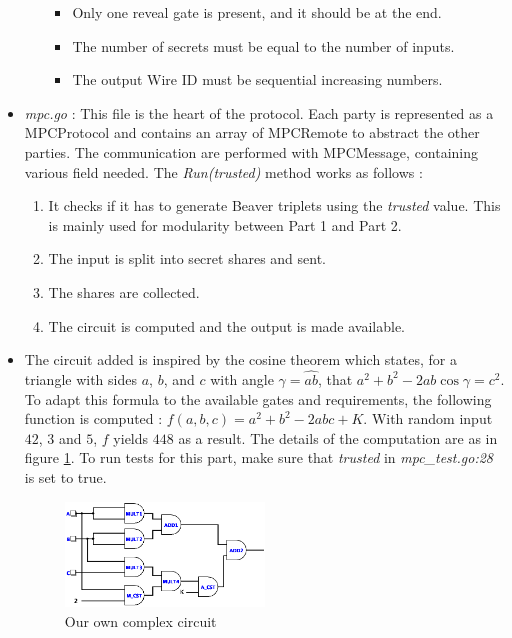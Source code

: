 \documentclass[10pt,conference]{IEEEtran}
\begin{document}
\begin{itemize}
\begin{itemize}
            \begin{itemize}
                \item Only one reveal gate is present, and it should be at the end.
                \item The number of secrets must be equal to the number of inputs.
                \item The output Wire ID must be sequential increasing numbers.
            \end{itemize}
        \end{itemize}
    \item \textit{mpc.go} : This file is the heart of the protocol. Each party is represented as a MPCProtocol and contains an array of MPCRemote to abstract the other parties. The communication are performed with MPCMessage, containing various field needed. The \textit{Run(trusted)} method works as follows :
        \begin{enumerate}
            \item It checks if it has to generate Beaver triplets using the \textit{trusted} value. This is mainly used for modularity between Part 1 and Part 2.
            \item The input is split into secret shares and sent.
            \item The shares are collected.
            \item The circuit is computed and the output is made available.
        \end{enumerate}
      \item The circuit added is inspired by the cosine theorem which states, for a triangle with sides $a$, $b$, and $c$ with angle $\gamma = \widehat{ab}$, that $a^2 + b^2 - 2ab\cos\gamma = c^2$. To adapt this formula to the available gates and requirements, the following function is computed : $f(a,b,c) = a^2 + b^2 - 2abc + K$. With random input $42$, $3$ and $5$, $f$ yields $448$ as a result. The details of the computation are as in figure \ref{fig:circ}. To run tests for this part, make sure that \textit{trusted} in \textit{mpc\_test.go:28} is set to true.
\begin{figure}[h]
  \caption{Our own complex circuit}
  \label{fig:circ}
  \includegraphics[width=0.5\textwidth]{main.png}
\end{figure}
\end{itemize}
\end{document}

